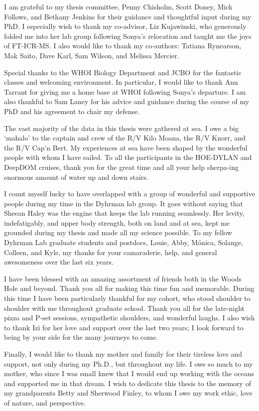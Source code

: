 {I am grateful to my thesis committee, Penny Chisholm, Scott Doney, Mick Follows, and Bethany Jenkins for their guidance and thoughtful input during my PhD. I especially wish to thank my co-advisor, Liz Kujawinski, who generously folded me into her lab group following Sonya's relocation and taught me the joys of FT-ICR-MS. I also would like to thank my co-authors: Tatiana Rynearson, Mak Saito, Dave Karl, Sam Wilson, and Melissa Mercier. \par 

Special thanks to the WHOI Biology Department and JCBO for the fantastic classes and welcoming environment. In particular, I would like to thank Ann Tarrant for giving me a home base at WHOI following Sonya's departure. I am also thankful to Sam Laney for his advice and guidance during the course of my PhD and his agreement to chair my defense. \par 

The vast majority of the data in this thesis were gathered at sea. I owe a big `mahalo' to the captain and crew of the R/V Kilo Moana, the R/V Knorr, and the R/V Cap'n Bert. My experiences at sea have been shaped by the wonderful people with whom I have sailed. To all the participants in the HOE-DYLAN and DeepDOM cruises, thank you for the great time and all your help sherpa-ing enormous amount of water up and down stairs.\par

I count myself lucky to have overlapped with a group of wonderful and supportive people during my time in the Dyhrman lab group. It goes without saying that Sheean Haley was the engine that keeps the lab running seamlessly. Her levity, indefatigably, and upper body strength, both on land and at sea, kept me grounded during my thesis and made all my science possible. To my fellow Dyhrman Lab graduate students and postdocs, Louie, Abby, M\'{o}nica, Solange, Colleen, and Kyle, my thanks for your camaraderie, help, and general awesomeness over the last six years. \par

I have been blessed with an amazing assortment of friends both in the Woods Hole and beyond. Thank you all for making this time fun and memorable. During this time I have been particularly thankful for my cohort, who stood shoulder to shoulder with me throughout graduate school. Thank you all for the late-night pizza and P-set sessions, sympathetic shoulders, and wonderful laughs. I also wish to thank Izi for her love and support over the last two years; I look forward to being by your side for the many journeys to come. \par
 
Finally, I would like to thank my mother and family for their tireless love and support, not only during my Ph.D., but throughout my life. I owe so much to my mother, who since I was small knew that I would end up working with the oceans and supported me in that dream. I wish to dedicate this thesis to the memory of my grandparents Betty and Sherwood Finley, to whom I owe my work ethic, love of nature, and perspective.\par 


}
 


